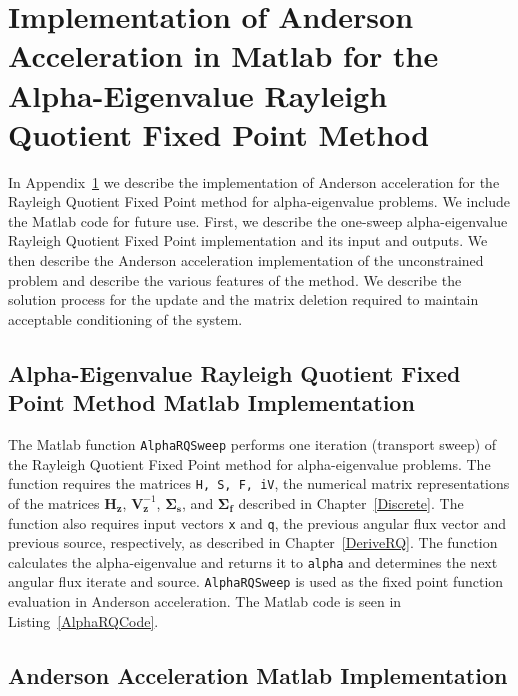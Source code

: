 \chapter[Implementation of Anderson Acceleration in Matlab for the Alpha-Eigenvalue Rayleigh Quotient Fixed Point Method][Anderson Acceleration Matlab Implementation]{Implementation of Anderson Acceleration in Matlab for the Alpha-Eigenvalue Rayleigh Quotient Fixed Point Method}

\label{AnderAccMATLAB}

In Appendix~\ref{AnderAccMATLAB} we describe the implementation of Anderson acceleration for the Rayleigh Quotient Fixed Point method for alpha-eigenvalue problems. We include the Matlab code for future use. First, we describe the one-sweep alpha-eigenvalue Rayleigh Quotient Fixed Point implementation and its input and outputs. We then describe the Anderson acceleration implementation of the unconstrained problem and describe the various features of the method. We describe the solution process for the update and the matrix deletion required to maintain acceptable conditioning of the system.

\section{Alpha-Eigenvalue Rayleigh Quotient Fixed Point Method Matlab Implementation}

The Matlab function \texttt{AlphaRQSweep} performs one iteration (transport sweep) of the Rayleigh Quotient Fixed Point method for alpha-eigenvalue problems. The function requires the matrices \texttt{H, S, F, iV}, the numerical matrix representations of the matrices $\mathbf{H}_{\mathbf{z}}$, $\mathbf{V}_{\mathbf{z}}^{-1}$, $\mathbf{\Sigma_{s}}$, and $\mathbf{\Sigma_{f}}$ described in Chapter~\ref{Discrete}. The function also requires input vectors \texttt{x} and \texttt{q}, the previous angular flux vector and previous source, respectively, as described in Chapter~\ref{DeriveRQ}. The function calculates the alpha-eigenvalue and returns it to \texttt{alpha} and determines the next angular flux iterate and source. \texttt{AlphaRQSweep} is used as the fixed point function evaluation in Anderson acceleration. The Matlab code is seen in Listing~\ref{AlphaRQCode}.

\clearpage



\clearpage

\section{Anderson Acceleration Matlab Implementation}
